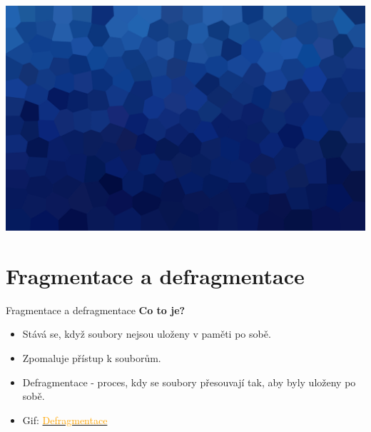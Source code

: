\documentclass[aspectratio=169,xcolor=dvipsnames, t]{beamer}
\begin{document}
{
{
    \includegraphics[width=\paperwidth,height=\paperheight]{AICStyleData/logos/mene_polygonu_bg.png}
}
\section{Fragmentace a defragmentace}
\begin{frame}{Fragmentace a defragmentace}
\textbf{\large Co to je?}
\begin{itemize}
\item Stává se, když soubory nejsou uloženy v paměti po sobě.
\item Zpomaluje přístup k souborům.
\item Defragmentace - proces, kdy se soubory přesouvají tak, aby byly uloženy po sobě.
\item Gif: \href{https://upload.wikimedia.org/wikipedia/commons/d/d0/FragmentationDefragmentation.gif}{\textcolor{orange}{Defragmentace}} 
\end{itemize}

\end{frame}
}





\makefinalpage
\end{document}
